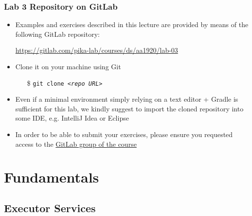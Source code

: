 \documentclass{beamer}\mode<presentation>{\usetheme{AMSCesenaPurpleAndGold}}
\begin{document}
\begin{frame}
\frametitle{Lab 3 Repository on GitLab}

	\begin{itemize}
		\item Examples and exercises described in this lecture are provided by means of the following GitLab repository:
		\begin{center}
			\url{https://gitlab.com/pika-lab/courses/ds/aa1920/lab-03}
		\end{center}
		
		\vfill
		
		\item Clone it on your machine using Git
		\begin{itemize}
		    \item[\$] \texttt{git clone \textit{<repo URL>}}
		\end{itemize}
		
		\vfill
		
		\item Even if a minimal environment simply relying on a text editor + Gradle is sufficient for this lab, we kindly suggest to import the cloned repository into some IDE, e.g. IntelliJ Idea or Eclipse
		
		\vfill
		
		\item In order to be able to submit your exercises, please ensure you requested access to the \href{https://gitlab.com/pika-lab/courses/ds/aa1920}{GitLab group of the course}
	\end{itemize}

\end{frame}

\section{Fundamentals}

\subsection{Executor Services}
\end{document}
